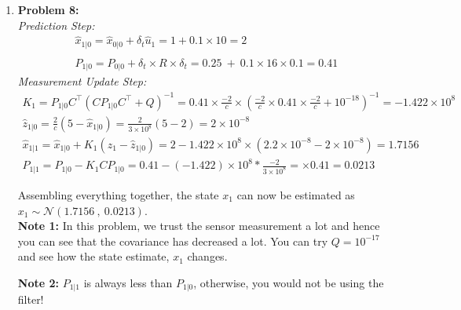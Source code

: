 \documentclass[letterpaper]{article}
\begin{document}
\begin{enumerate}
\begin{enumerate}
\begin{verbatim}
        delta
        dfdx
\end{verbatim}


\end{enumerate}


\item \noindent \textbf{Problem 8:}\\
\textit{Prediction Step:}
\begin{align}
\hat x_{1|0}= \hat x_{0|0} + \delta_t \hat u_{1} = 1 + 0.1 \times 10 = 2\nonumber \\ \nonumber\\
P_{1|0} =  P_{0|0}  + \delta_t \times R \times  \delta_t= 0.25 ~+~ 0.1 \times 16 \times 0.1= 0.41 \nonumber 
\end{align}
\textit{Measurement Update Step:}
\begin{align}
K_{1} = P_{1|0} C^\top (C P_{1|0} C^\top + Q)^{-1}= 0.41 \times \frac{-2}{c} \times (\frac{-2}{c} \times 0.41 \times \frac{-2}{c} +10^{-18})^{-1} = -1.422 \times 10^8 \nonumber \\
\hat z_{1|0} = \frac{2}{c}(5-\hat x_{1|0}) = \frac{2}{3 \times 10^8}(5- 2) = 2 \times 10^{-8}\nonumber \\
\hat x_{1|1}= \hat x_{1|0} + K_{1}(z_{1} - \hat z_{1|0}) = 2 -1.422 \times 10^8 \times(2.2 \times 10^{-8} - 2 \times 10^{-8}) = 1.7156\nonumber \\
P_{1|1} = P_{1|0} -  K_{1} C P_{1|0} = 0.41 -  (-1.422) \times 10^8 * \frac{-2}{3 \times 10^8} = \times 0.41 = 0.0213 \nonumber 
\end{align}

Assembling everything together, the state $x_1$ can now be estimated as $ x_1 \sim \mathcal{N}(1.71	56~,~ 0.0213)$.\\

\textbf{Note 1:} In this problem, we trust the sensor measurement a lot and hence you can see that the covariance has decreased a lot. You can try $Q= 10^{-17}$ and see how the state estimate, $x_1$ changes. 
	
\textbf{Note 2:} $P_{1|1}$ is always less than $P_{1|0}$, otherwise, you would not be using the filter! 
\end{enumerate}
\end{document}
